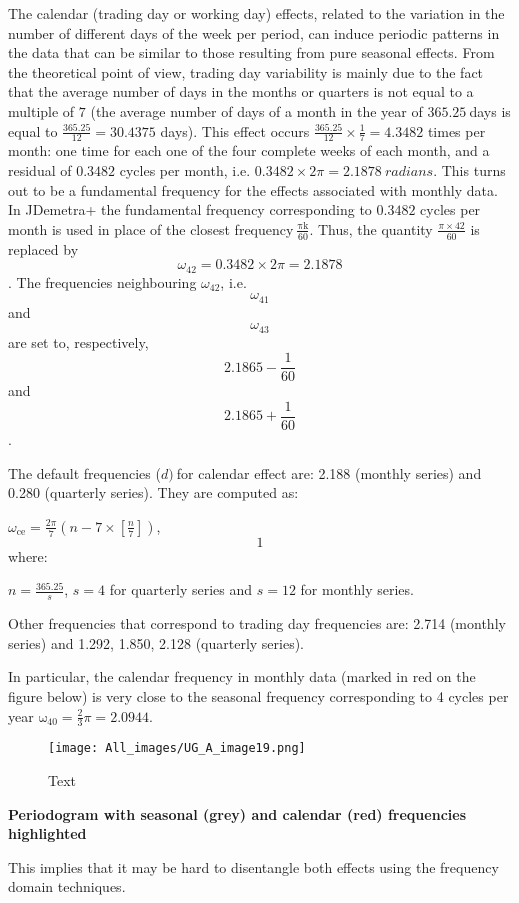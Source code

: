 \documentclass[
]{book}
\begin{document}
The calendar (trading day or working day) effects, related to the
variation in the number of different days of the week per period, can
induce periodic patterns in the data that can be similar to those
resulting from pure seasonal effects. From the theoretical point of
view, trading day variability is mainly due to the fact that the average
number of days in the months or quarters is not equal to a multiple of
\(7\) (the average number of days of a month in the year of \(365.25\ \)days
is equal to \(\frac{365.25}{12} = 30.4375\) days). This effect occurs
\(\frac{365.25}{12} \times \frac{1}{7} = 4.3482\) times per month: one
time for each one of the four complete weeks of each month, and a
residual of \(0.3482\) cycles per month, i.e.
\(0.3482 \times 2\pi = 2.1878\ radians\). This turns out to be a
fundamental frequency for the effects associated with monthly data. In
JDemetra+ the fundamental frequency corresponding to \(0.3482\) cycles per
month is used in place of the closest frequency\(\ \frac{\text{πk}}{60}\).
Thus, the quantity \(\frac{\pi \times 42}{60}\) is replaced
by \[\omega_{42} = 0.3482 \times 2\pi = 2.1878\]. The frequencies
neighbouring \(\omega_{42}\), i.e.~\[\omega_{41}\] and \[\omega_{43}\] are set
to, respectively, \[2.1865 - \frac{1}{60}\] and \[2.1865 + \frac{1}{60}\].

The default frequencies (\(d)\ \)for calendar effect are: 2.188 (monthly
series) and 0.280 (quarterly series). They are computed as:

\(\omega_{\text{ce}} = \frac{2\pi}{7}\left( n - 7 \times \left\lbrack \frac{n}{7} \right\rbrack \right)\), \[1\]
where:

\(n = \frac{365.25}{s}\), \(s = 4\) for quarterly series and \(s = 12\) for
monthly series.

Other frequencies that correspond to trading day frequencies are: 2.714
(monthly series) and 1.292, 1.850, 2.128 (quarterly series).

In particular, the calendar frequency in monthly data (marked in red on the figure below) is very close to the seasonal frequency corresponding to 4
cycles per year \(\text{ω}_{40} = \frac{2}{3}\pi = 2.0944\).

\begin{figure}
\centering
\texttt{[image: All\_images/UG\_A\_image19.png]}
\caption{Text}
\end{figure}

\textbf{Periodogram with seasonal (grey) and calendar (red)
frequencies highlighted}

This implies that it may be hard to disentangle both effects using the
frequency domain techniques.
\end{document}
